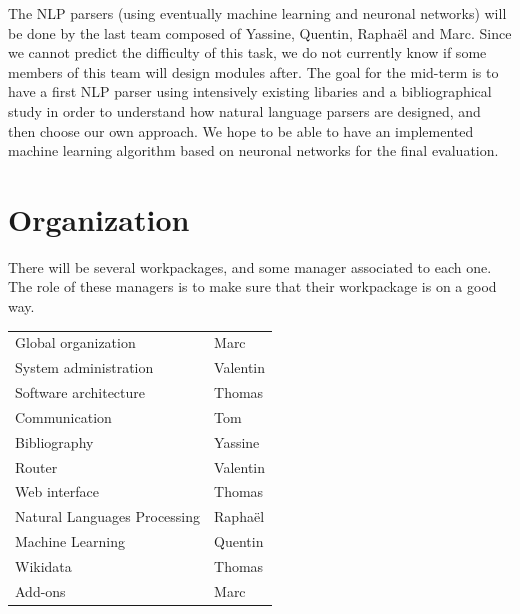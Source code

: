\documentclass[a4paper,10pt]{article}
\begin{document}
The NLP parsers (using eventually machine learning and neuronal networks) will be done by the
last team composed of Yassine, Quentin, Raphaël and Marc. Since we cannot predict the difficulty
of this task, we do not currently know if some members of this team will design modules after.
The goal for the mid-term is to have a first NLP parser using intensively existing libaries and a
bibliographical study in order to understand how natural language parsers are designed, and then
choose our own approach. We hope to be able to have an implemented machine learning algorithm
based on neuronal networks for the final evaluation.

\section{Organization}

There will be several workpackages, and some manager associated to each one.
The role of these managers is to make sure that their workpackage is on a good way.

\begin{tabular}{ll}
  Global organization & Marc\\
  System administration & Valentin\\
  Software architecture & Thomas\\
  Communication & Tom\\
  Bibliography & Yassine\\
  Router & Valentin\\
  Web interface & Thomas\\
  Natural Languages Processing & Raphaël\\
  Machine Learning & Quentin\\
  Wikidata & Thomas\\
  Add-ons & Marc\\
\end{tabular}

\end{document}
